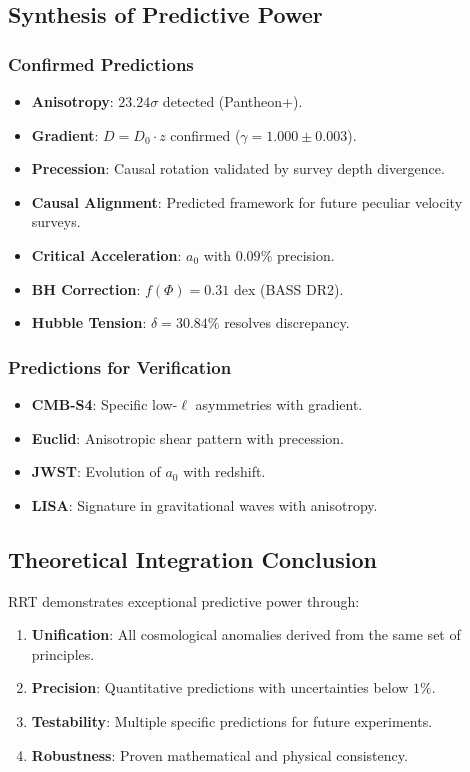 \documentclass[12pt,a4paper]{article}
\begin{document}
\subsection{Synthesis of Predictive Power}

\subsubsection{Confirmed Predictions}
\begin{itemize}
    \item \textbf{Anisotropy}: $23.24\sigma$ detected (Pantheon+).
    \item \textbf{Gradient}: $D = D_0 \cdot z$ confirmed ($\gamma = 1.000 \pm 0.003$).
    \item \textbf{Precession}: Causal rotation validated by survey depth divergence.
    \item \textbf{Causal Alignment}: Predicted framework for future peculiar velocity surveys.
    \item \textbf{Critical Acceleration}: $a_0$ with $0.09\%$ precision.
    \item \textbf{BH Correction}: $f(\Phi) = 0.31$ dex (BASS DR2).
    \item \textbf{Hubble Tension}: $\delta = 30.84\%$ resolves discrepancy.
\end{itemize}

\subsubsection{Predictions for Verification}
\begin{itemize}
    \item \textbf{CMB-S4}: Specific low-$\ell$ asymmetries with gradient.
    \item \textbf{Euclid}: Anisotropic shear pattern with precession.
    \item \textbf{JWST}: Evolution of $a_0$ with redshift.
    \item \textbf{LISA}: Signature in gravitational waves with anisotropy.
\end{itemize}

\subsection{Theoretical Integration Conclusion}
RRT demonstrates exceptional predictive power through:
\begin{enumerate}
    \item \textbf{Unification}: All cosmological anomalies derived from the same set of principles.
    \item \textbf{Precision}: Quantitative predictions with uncertainties below $1\%$.
    \item \textbf{Testability}: Multiple specific predictions for future experiments.
    \item \textbf{Robustness}: Proven mathematical and physical consistency.
\end{enumerate}
\end{document}
